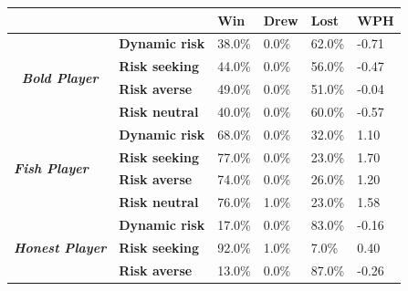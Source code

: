 \begin{table}[h]
    \centering
    \begin{tabular}{ll|l|l|l|l|}
    \cline{3-6}
                                                                           &                       & \textbf{Win} & \textbf{Drew} & \textbf{Lost} & \textbf{WPH} \\ \hline
    \multicolumn{1}{|c|}{\multirow{4}{*}{\textit{\textbf{Bold Player}}}}   & \textbf{Dynamic risk} &    38.0\%    &     0.0\%     &     62.0\%    &    -0.71     \\ \cline{2-6} 
    \multicolumn{1}{|c|}{}                                                 & \textbf{Risk seeking} &    44.0\%    &     0.0\%     &     56.0\%    &    -0.47     \\ \cline{2-6} 
    \multicolumn{1}{|c|}{}                                                 & \textbf{Risk averse}  &    49.0\%    &     0.0\%     &     51.0\%    &    -0.04     \\ \cline{2-6} 
    \multicolumn{1}{|c|}{}                                                 & \textbf{Risk neutral} &    40.0\%    &     0.0\%     &     60.0\%    &    -0.57     \\ \hline
    \multicolumn{1}{|l|}{\multirow{4}{*}{\textit{\textbf{Fish Player}}}}   & \textbf{Dynamic risk} &    68.0\%    &     0.0\%     &     32.0\%    &     1.10     \\ \cline{2-6} 
    \multicolumn{1}{|l|}{}                                                 & \textbf{Risk seeking} &    77.0\%    &     0.0\%     &     23.0\%    &     1.70     \\ \cline{2-6} 
    \multicolumn{1}{|l|}{}                                                 & \textbf{Risk averse}  &    74.0\%    &     0.0\%     &     26.0\%    &     1.20     \\ \cline{2-6} 
    \multicolumn{1}{|l|}{}                                                 & \textbf{Risk neutral} &    76.0\%    &     1.0\%     &     23.0\%    &     1.58     \\ \hline
    \multicolumn{1}{|l|}{\multirow{4}{*}{\textit{\textbf{Honest Player}}}} & \textbf{Dynamic risk} &    17.0\%    &     0.0\%     &     83.0\%    &    -0.16     \\ \cline{2-6} 
    \multicolumn{1}{|l|}{}                                                 & \textbf{Risk seeking} &    92.0\%    &     1.0\%     &     7.0\%     &     0.40     \\ \cline{2-6} 
    \multicolumn{1}{|l|}{}                                                 & \textbf{Risk averse}  &    13.0\%    &     0.0\%     &     87.0\%    &    -0.26     \\ \cline{2-6} 

\end{tabular}
\end{table}
